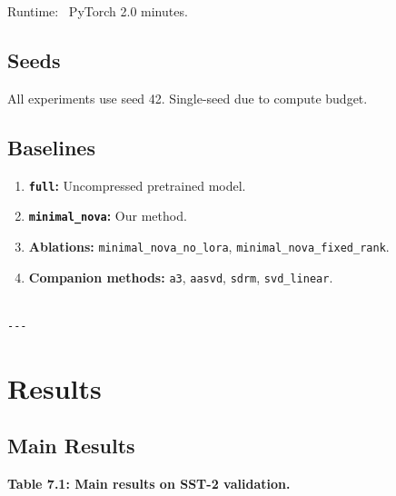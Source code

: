 Runtime: ~PyTorch 2.0 minutes.

\subsection{Seeds}

All experiments use seed 42. Single-seed due to compute budget.

\subsection{Baselines}

\begin{enumerate}
\item \textbf{\texttt{full}:} Uncompressed pretrained model.
\item \textbf{\texttt{minimal\_nova}:} Our method.
\item \textbf{Ablations:} \texttt{minimal\_nova\_no\_lora}, \texttt{minimal\_nova\_fixed\_rank}.
\item \textbf{Companion methods:} \texttt{a3}, \texttt{aasvd}, \texttt{sdrm}, \texttt{svd\_linear}.
\end{enumerate}
\begin{lstlisting}

---
\end{lstlisting}


\section{Results}

\subsection{Main Results}

\textbf{Table 7.1: Main results on SST-2 validation.}

